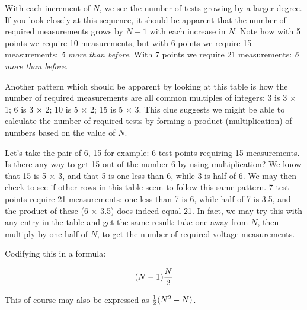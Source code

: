 With each increment of $N$, we see the number of tests growing by a larger degree.  If you look closely at this sequence, it should be apparent that the number of required measurements grows by $N-1$ with each increase in $N$.  Note how with 5 points we require 10 measurements, but with 6 points we require 15 measurements: {\it 5 more than before}.  With 7 points we require 21 measurements: {\it 6 more than before}.

Another pattern which should be apparent by looking at this table is how the number of required measurements are all common multiples of integers: 3 is 3 $\times$ 1; 6 is 3 $\times$ 2; 10 is 5 $\times$ 2; 15 is 5 $\times$ 3.  This clue suggests we might be able to calculate the number of required tests by forming a product (multiplication) of numbers based on the value of $N$.

Let's take the pair of 6, 15 for example: 6 test points requiring 15 measurements.  Is there any way to get 15 out of the number 6 by using multiplication?  We know that 15 is 5 $\times$ 3, and that 5 is one less than 6, while 3 is half of 6.  We may then check to see if other rows in this table seem to follow this same pattern.  7 test points require 21 measurements: one less than 7 is 6, while half of 7 is 3.5, and the product of these (6 $\times$ 3.5) does indeed equal 21.  In fact, we may try this with any entry in the table and get the same result: take one away from $N$, then multiply by one-half of $N$, to get the number of required voltage measurements.

Codifying this in a formula:

$$(N-1){N \over 2}$$

This of course may also be expressed as ${1 \over 2}(N^2 - N)$.




